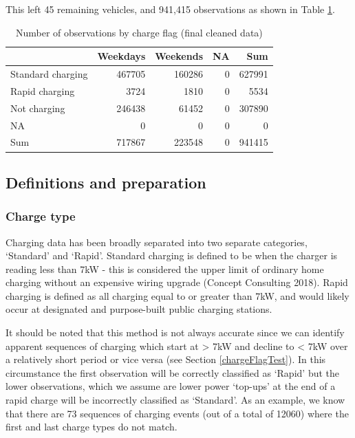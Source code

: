 \documentclass[]{article}
\begin{document}
This left 45 remaining vehicles, and 941,415 observations as shown in Table \ref{tab:finalTable}.

\begin{table}[t]

\caption{\label{tab:finalTable}Number of observations by charge flag (final cleaned data)}
\centering
\begin{tabular}{l|r|r|r|r}
\hline
  & Weekdays & Weekends & NA & Sum\\
\hline
Standard charging & 467705 & 160286 & 0 & 627991\\
\hline
Rapid charging & 3724 & 1810 & 0 & 5534\\
\hline
Not charging & 246438 & 61452 & 0 & 307890\\
\hline
NA & 0 & 0 & 0 & 0\\
\hline
Sum & 717867 & 223548 & 0 & 941415\\
\hline
\end{tabular}
\end{table}

\hypertarget{definitions}{%
\subsection{Definitions and preparation}\label{definitions}}

\hypertarget{chargeType}{%
\subsubsection{Charge type}\label{chargeType}}

Charging data has been broadly separated into two separate categories, `Standard' and `Rapid'. Standard charging is defined to be when the charger is reading less than 7kW - this is considered the upper limit of ordinary home charging without an expensive wiring upgrade (Concept Consulting 2018). Rapid charging is defined as all charging equal to or greater than 7kW, and would likely occur at designated and purpose-built public charging stations.

It should be noted that this method is not always accurate since we can identify apparent sequences of charging which start at \textgreater{} 7kW and decline to \textless{} 7kW over a relatively short period or vice versa (see Section \ref{chargeFlagTest}). In this circumstance the first observation will be correctly classified as `Rapid' but the lower observations, which we assume are lower power `top-ups' at the end of a rapid charge will be incorrectly classified as `Standard'. As an example, we know that there are 73 sequences of charging events (out of a total of 12060) where the first and last charge types do not match.
\end{document}
